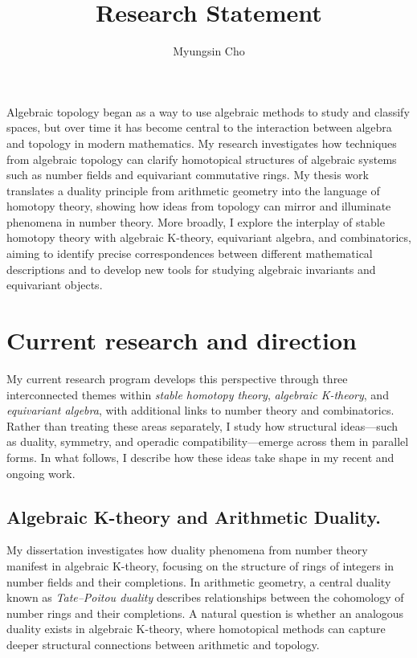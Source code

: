 \documentclass[11pt]{article}
\title{Research Statement}
\author{Myungsin Cho}
\date{}
\begin{document}

\maketitle

Algebraic topology began as a way to use algebraic methods to study and classify spaces, but over time it has become central to the interaction between algebra and topology in modern mathematics.
My research investigates how techniques from algebraic topology can clarify homotopical structures of algebraic systems such as number fields and equivariant commutative rings.
My thesis work translates a duality principle from arithmetic geometry into the language of homotopy theory, showing how ideas from topology can mirror and illuminate phenomena in number theory.
More broadly, I explore the interplay of stable homotopy theory with algebraic K-theory, equivariant algebra, and combinatorics, aiming to identify precise correspondences between different mathematical descriptions and to develop new tools for studying algebraic invariants and equivariant objects.

\section{Current research and direction}

My current research program develops this perspective through three interconnected themes within {\it stable homotopy theory}, {\it algebraic K-theory}, and {\it equivariant algebra}, with additional links to number theory and combinatorics.
Rather than treating these areas separately, I study how structural ideas—such as duality, symmetry, and operadic compatibility—emerge across them in parallel forms.
In what follows, I describe how these ideas take shape in my recent and ongoing work.

\subsection{Algebraic K-theory and Arithmetic Duality.}
My dissertation investigates how duality phenomena from number theory manifest in algebraic K-theory, focusing on the structure of rings of integers in number fields and their completions.
In arithmetic geometry, a central duality known as {\it Tate–Poitou duality} describes relationships between the cohomology of number rings and their completions. 
A natural question is whether an analogous duality exists in algebraic K-theory, where homotopical methods can capture deeper structural connections between arithmetic and topology.
\end{document}
